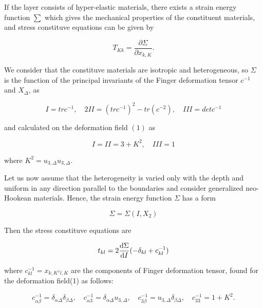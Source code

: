 \documentclass[8pt, a4paper]{article}
\begin{document}
If the layer consists of hyper-elastic materials, there exists a strain energy function $\sum$ which gives the mechanical properties of the constituent materials, and stress constituve equations can be given by

\begin{fleqn}[\parindent]
    \begin{equation}
         \displaystyle T_{Kk}=\frac{\partial\Sigma}{\partial x_{k,K}}.
    \end{equation}
\end{fleqn}



We consider that the constituve materials are isotropic and heterogeneous, so $\Sigma$ is the function of the principal invariants of the Finger deformation tensor $c^{-1}$ and $X_{\Delta}$, as 

\begin{fleqn}[\parindent]
    \begin{equation}
         \displaystyle I=trc^{-1},\quad 2II=(trc^{-1})^2-tr(c^{-2}),\quad III=detc^{-1}
    \end{equation}
\end{fleqn}

and calculated on the deformation field $(1)$ as

\begin{fleqn}
    \begin{equation}
        I=II=3+K^2,\quad III=1
    \end{equation}
\end{fleqn}

where $K^2=u_{3,\Delta}u_{3,\Delta}.$

Let us now assume that the heterogeneity is varied only with the depth and uniform in any direction parallel to the boundaries and consider generalized neo-Hookean materials. Hence, the strain energy function $\Sigma$ has a form

\begin{fleqn}
    \begin{equation}
        \Sigma=\Sigma(I,X_{2})
    \end{equation}
\end{fleqn}

Then the stress constituve equations are

\begin{fleqn}
    \begin{equation}
        \displaystyle t_{kl}=2\diff[1]\Sigma I (-\delta_{kl}+c_{kl}^{-1})
    \end{equation}
\end{fleqn}

where $c_{kl}^{-1}=x_{k,K^{x}l,K}$ are the components of Finger deformation tensor, found for the deformation field(1) as follows:

\begin{fleqn}
    \begin{equation}
        \displaystyle c_{\alpha\beta}^{-1}=\delta_{\alpha\Delta}\delta_{\beta\Delta},\quad c_{\alpha3}^{-1}=\delta_{\alpha\Delta}u_{3,\Delta},\quad c_{3\beta}^{-1}=u_{3,\Delta}\delta_{\beta\Delta},\quad c_{33}^{-1}=1+K^2.
    \end{equation}
\end{fleqn}
\end{document}
